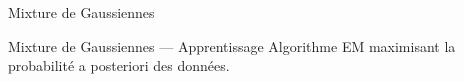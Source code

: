 \begin{frame}{Mixture de Gaussiennes}
\end{frame}

\begin{frame}{Mixture de Gaussiennes --- Apprentissage}
  Algorithme EM maximisant la probabilité a posteriori des données.
\end{frame}
